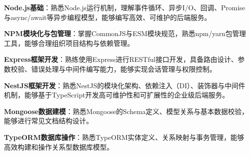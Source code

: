 \item \textbf{Node.js基础}：熟悉Node.js运行机制，理解事件循环、异步I/O、回调、Promise与async/await等异步编程模型，能够编写高效、可维护的后端服务。
\item \textbf{NPM模块化与包管理}：掌握CommonJS与ESM模块规范，熟悉npm/yarn包管理工具，能够合理组织项目结构与依赖管理。
\item \textbf{Express框架开发}：熟练使用Express进行RESTful接口开发，具备路由设计、参数校验、错误处理与中间件编写能力，能够实现会话管理与权限控制。
\item \textbf{NestJS框架开发}：熟悉NestJS的模块化架构、依赖注入（DI）、装饰器与中间件机制，能够基于TypeScript开发高可维护性和可扩展性的企业级后端服务。
\item \textbf{Mongoose数据建模}：熟悉Mongoose的Schema定义、模型关系与基本数据校验，能够进行常见文档结构设计。
\item \textbf{TypeORM数据库操作}：熟悉TypeORM实体定义、关系映射与事务管理，能够高效构建和操作关系型数据库模型。